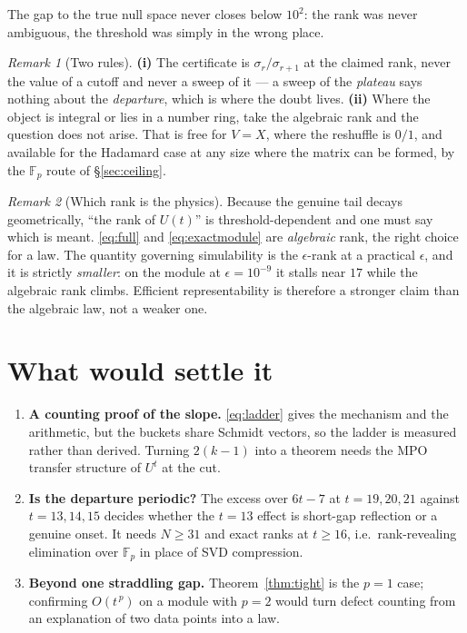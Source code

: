 \documentclass[11pt]{article}
\theoremstyle{plain}
\theoremstyle{remark}
\newtheorem{remark}{Remark}
\begin{document}
\noindent The gap to the true null space never closes below $10^{2}$: the rank
was never ambiguous, the threshold was simply in the wrong place.

\begin{remark}[Two rules]
\textbf{(i)} The certificate is $\sigma_r/\sigma_{r+1}$ at the claimed rank, never
the value of a cutoff and never a sweep of it --- a sweep of the \emph{plateau}
says nothing about the \emph{departure}, which is where the doubt lives.
\textbf{(ii)} Where the object is integral or lies in a number ring, take the
algebraic rank and the question does not arise. That is free for $V=X$, where
the reshuffle is $0/1$, and available for the Hadamard case at any size where
the matrix can be formed, by the $\mathbb F_p$ route of \S\ref{sec:ceiling}.
\end{remark}

\begin{remark}[Which rank is the physics]
Because the genuine tail decays geometrically, ``the rank of $U(t)$'' is
threshold-dependent and one must say which is meant. \eqref{eq:full} and
\eqref{eq:exactmodule} are \emph{algebraic} rank, the right choice for a law. The
quantity governing simulability is the $\epsilon$-rank at a practical $\epsilon$,
and it is strictly \emph{smaller}: on the module at $\epsilon=10^{-9}$ it stalls
near $17$ while the algebraic rank climbs. Efficient representability is
therefore a stronger claim than the algebraic law, not a weaker one.
\end{remark}

\section{What would settle it}

\begin{enumerate}
\item \textbf{A counting proof of the slope.} \eqref{eq:ladder} gives the
mechanism and the arithmetic, but the buckets share Schmidt vectors, so the
ladder is measured rather than derived. Turning $2(k-1)$ into a theorem needs
the MPO transfer structure of $U^t$ at the cut.
\item \textbf{Is the departure periodic?} The excess over $6t-7$ at
$t=19,20,21$ against $t=13,14,15$ decides whether the $t=13$ effect is
short-gap reflection or a genuine onset. It needs $N\ge31$ and exact ranks at
$t\ge16$, i.e.\ rank-revealing elimination over $\mathbb F_p$ in place of SVD
compression.
\item \textbf{Beyond one straddling gap.} Theorem~\ref{thm:tight} is the $p=1$
case; confirming $O(t^{\,p})$ on a module with $p=2$ would turn defect counting
from an explanation of two data points into a law.
\end{enumerate}
\end{document}
